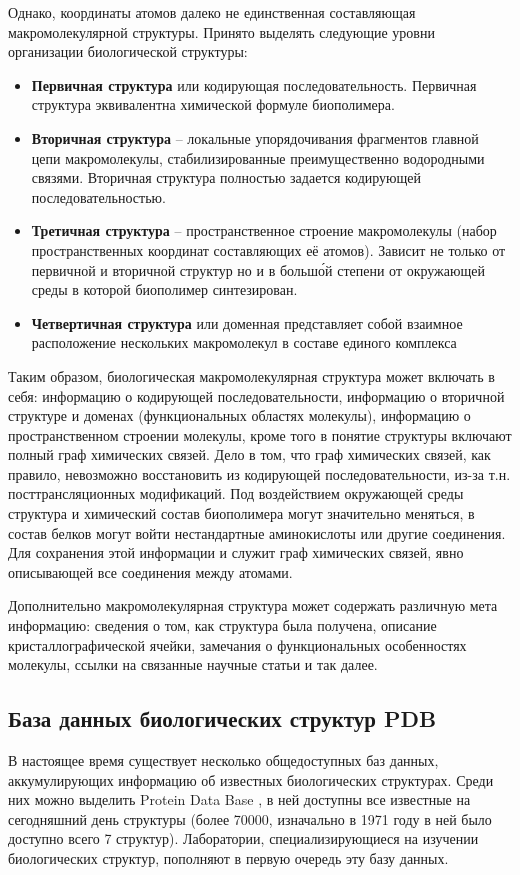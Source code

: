\documentclass[a4paper, 12pt, titlepage, utf8]{extarticle}
\begin{document}
Однако, координаты атомов далеко не единственная составляющая макромолекулярной структуры. Принято выделять следующие уровни организации биологической структуры:
\begin{itemize}
    \item \textbf{Первичная структура} или кодирующая последовательность. Первичная структура эквивалентна химической формуле биополимера.
    \item \textbf{Вторичная структура} -- локальные упорядочивания фрагментов главной цепи макромолекулы, стабилизированные преимущественно водородными связями. Вторичная структура полностью задается кодирующей последовательностью.
    \item \textbf{Третичная структура} -- пространственное строение макромолекулы (набор пространственных координат составляющих её атомов). Зависит не только от первичной и вторичной структур но и в больш\'{о}й степени от окружающей среды в которой биополимер синтезирован. 
    \item \textbf{Четвертичная структура} или доменная представляет собой взаимное расположение нескольких макромолекул в составе единого комплекса 
\end{itemize}

Таким образом, биологическая макромолекулярная структура может включать в себя: информацию о кодирующей последовательности, информацию о вторичной структуре и доменах (функциональных областях молекулы), информацию о пространственном строении молекулы, кроме того в понятие структуры включают полный граф химических связей. Дело в том, что граф химических связей, как правило, невозможно восстановить из кодирующей последовательности, из-за т.н. посттрансляционных модификаций. Под воздействием окружающей среды структура и химический состав биополимера могут значительно меняться, в состав белков могут войти нестандартные аминокислоты или другие соединения. Для сохранения этой информации и служит граф химических связей, явно описывающей все соединения между атомами.
 
Дополнительно макромолекулярная структура может содержать различную мета информацию: сведения о том, как структура была получена, описание кристаллографической ячейки, замечания о функциональных особенностях молекулы, ссылки на связанные научные статьи и так далее.

\subsection{База данных биологических структур PDB}
В настоящее время существует несколько общедоступных баз данных, аккумулирующих информацию об известных биологических структурах. Среди них можно выделить Protein Data Base \cite{pdb}, в ней доступны все известные на сегодняшний день структуры (более 70000,  изначально в 1971 году в ней было доступно всего 7 структур). Лаборатории, специализирующиеся на изучении биологических структур, пополняют в первую очередь эту базу данных. 
\end{document}
